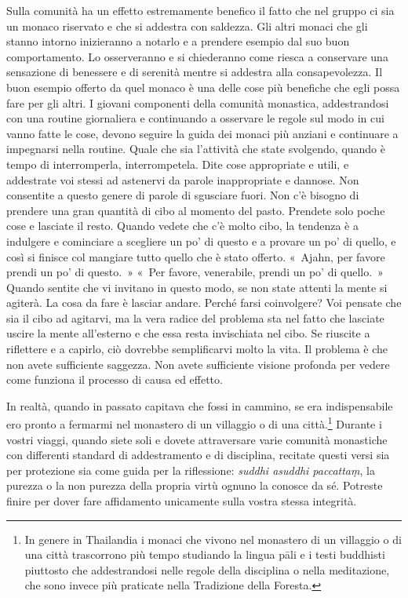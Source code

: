 Sulla comunità ha un effetto estremamente benefico il fatto che nel
gruppo ci sia un monaco riservato e che si addestra con saldezza. Gli
altri monaci che gli stanno intorno inizieranno a notarlo e a prendere
esempio dal suo buon comportamento. Lo osserveranno e si chiederanno
come riesca a conservare una sensazione di benessere e di serenità
mentre si addestra alla consapevolezza. Il buon esempio offerto da quel
monaco è una delle cose più benefiche che egli possa fare per gli altri.
I giovani componenti della comunità monastica, addestrandosi con una
routine giornaliera e continuando a osservare le regole sul modo in cui
vanno fatte le cose, devono seguire la guida dei monaci più anziani e
continuare a impegnarsi nella routine. Quale che sia l'attività che
state svolgendo, quando è tempo di interromperla, interrompetela. Dite
cose appropriate e utili, e addestrate voi stessi ad astenervi da parole
inappropriate e dannose. Non consentite a questo genere di parole di
sgusciare fuori. Non c'è bisogno di prendere una gran quantità di cibo
al momento del pasto. Prendete solo poche cose e lasciate il resto.
Quando vedete che c'è molto cibo, la tendenza è a indulgere e cominciare
a scegliere un po' di questo e a provare un po' di quello, e così si
finisce col mangiare tutto quello che è stato offerto. «~Ajahn, per
favore prendi un po' di questo.~» «~Per favore, venerabile, prendi un
po' di quello.~» Quando sentite che vi invitano in questo modo, se non
state attenti la mente si agiterà. La cosa da fare è lasciar andare.
Perché farsi coinvolgere? Voi pensate che sia il cibo ad agitarvi, ma la
vera radice del problema sta nel fatto che lasciate uscire la mente
all'esterno e che essa resta invischiata nel cibo. Se riuscite a
riflettere e a capirlo, ciò dovrebbe semplificarvi molto la vita. Il
problema è che non avete sufficiente saggezza. Non avete sufficiente
visione profonda per vedere come funziona il processo di causa ed
effetto.

In realtà, quando in passato capitava che fossi in cammino, se era
indispensabile ero pronto a fermarmi nel monastero di un villaggio o di
una città.\footnote{In genere in Thailandia i monaci che vivono nel
  monastero di un villaggio o di una città trascorrono più tempo
  studiando la lingua pāli e i testi buddhisti piuttosto che
  addestrandosi nelle regole della disciplina o nella meditazione, che
  sono invece più praticate nella Tradizione della Foresta.} Durante i
vostri viaggi, quando siete soli e dovete attraversare varie comunità
monastiche con differenti standard di addestramento e di disciplina,
recitate questi versi sia per protezione sia come guida per la
riflessione: \emph{suddhi asuddhi paccattaṃ}, la purezza o la non
purezza della propria virtù ognuno la conosce da sé. Potreste finire per
dover fare affidamento unicamente sulla vostra stessa integrità.

